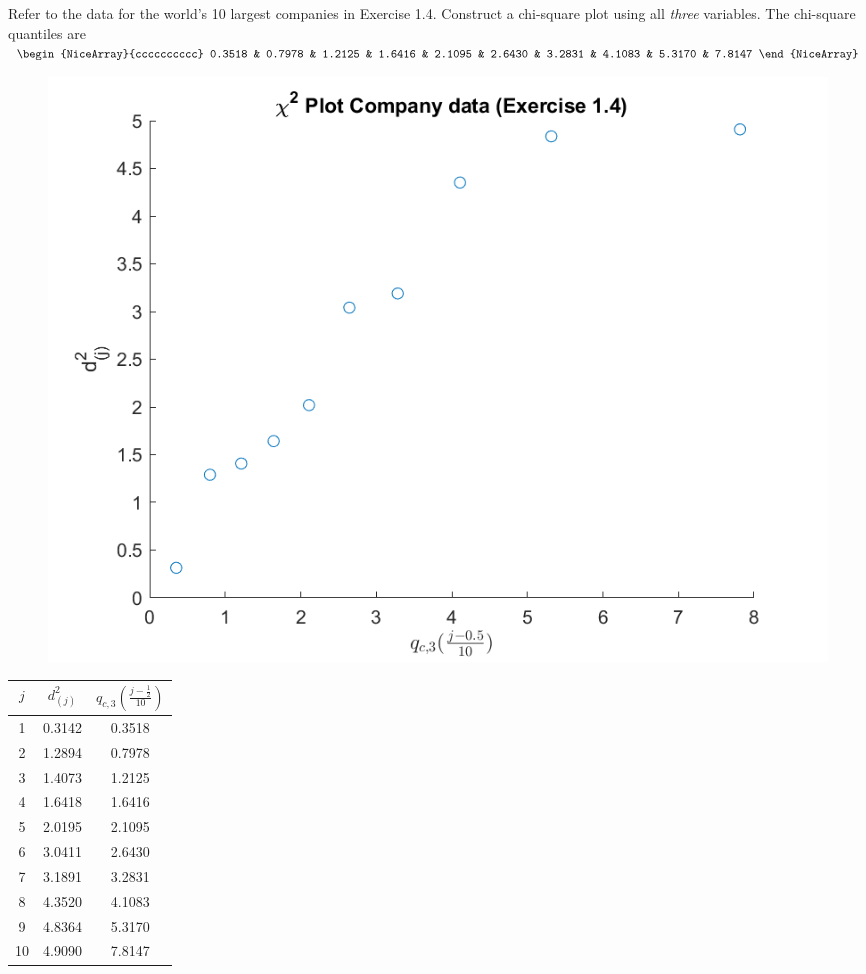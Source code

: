 Refer to the data for the world's 10 largest companies in Exercise 1.4. Construct a chi-square
plot using all \textit{three} variables. The chi-square quantiles are
$\begin{NiceArray}{cccccccccc}
    0.3518 & 0.7978 & 1.2125 & 1.6416 & 2.1095 & 2.6430 & 3.2831 & 4.1083 & 5.3170 & 7.8147
\end{NiceArray}
$
\begin{figure}[H]
    \includegraphics[scale=0.8]{./matlab/chapter-4/sol4.25.png}
\end{figure}

\begin{center}
    \begin{tabular}{ccc}
        \hline
        $j$ & $d_{(j)}^{2}$ & $q_{c, 3}\left(\frac{j-\frac{1}{2}}{10}\right)$ \\
        \hline
        1 & 0.3142 & 0.3518 \\
        2 & 1.2894 & 0.7978 \\
        3 & 1.4073 & 1.2125 \\
        4 & 1.6418 & 1.6416 \\
        5 & 2.0195 & 2.1095 \\
        6 & 3.0411 & 2.6430 \\
        7 & 3.1891 & 3.2831 \\
        8 & 4.3520 & 4.1083 \\
        9 & 4.8364 & 5.3170 \\
       10 & 4.9090 & 7.8147 \\
       \hline
    \end{tabular}
\end{center}
